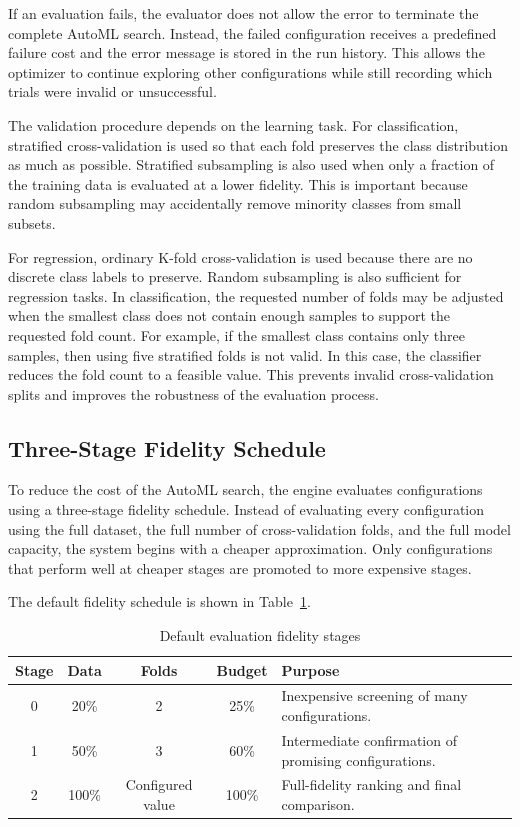 \documentclass[12pt,a4paper,oneside]{report}
\begin{document}
\noindent If an evaluation fails, the evaluator does not allow the error to terminate the
complete AutoML search. Instead, the failed configuration receives a predefined
failure cost and the error message is stored in the run history. This allows the
optimizer to continue exploring other configurations while still recording which
trials were invalid or unsuccessful.

\noindent The validation procedure depends on the learning task. For classification,
stratified cross-validation is used so that each fold preserves the class
distribution as much as possible. Stratified subsampling is also used when only a
fraction of the training data is evaluated at a lower fidelity. This is important
because random subsampling may accidentally remove minority classes from small
subsets.

\noindent For regression, ordinary K-fold cross-validation is used because there are no
discrete class labels to preserve. Random subsampling is also sufficient for
regression tasks. In classification, the requested number of folds may be
adjusted when the smallest class does not contain enough samples to support the
requested fold count. For example, if the smallest class contains only three
samples, then using five stratified folds is not valid. In this case, the
classifier reduces the fold count to a feasible value. This prevents invalid
cross-validation splits and improves the robustness of the evaluation process.

\subsection{Three-Stage Fidelity Schedule}

To reduce the cost of the AutoML search, the engine evaluates configurations
using a three-stage fidelity schedule. Instead of evaluating every configuration
using the full dataset, the full number of cross-validation folds, and the full
model capacity, the system begins with a cheaper approximation. Only
configurations that perform well at cheaper stages are promoted to more
expensive stages.

\noindent The default fidelity schedule is shown in Table~\ref{tab:fidelity-schedule}.

\begin{table}[H]
\centering
\caption{Default evaluation fidelity stages}
\label{tab:fidelity-schedule}
\renewcommand{\arraystretch}{1.25}
\begin{tabular}{c c c c p{}}
\toprule
\textbf{Stage} &
\textbf{Data} &
\textbf{Folds} &
\textbf{Budget} &
\textbf{Purpose} \\
\midrule
0 & 20\% & 2 & 25\% &
Inexpensive screening of many configurations. \\

1 & 50\% & 3 & 60\% &
Intermediate confirmation of promising configurations. \\

2 & 100\% & Configured value & 100\% &
Full-fidelity ranking and final comparison. \\
\bottomrule
\end{tabular}
\end{table}
\end{document}
